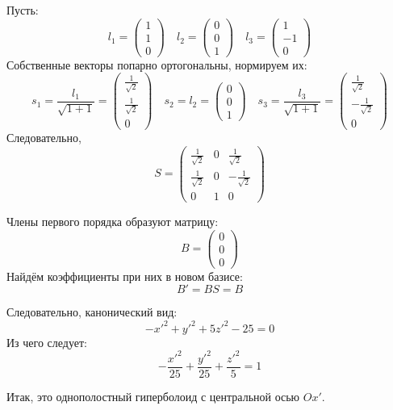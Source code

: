 Пусть:
\[
  l_1 =
  \begin{pmatrix}
    1 \\
    1 \\
    0
  \end{pmatrix} \quad
  l_2 =
  \begin{pmatrix}
    0 \\
    0 \\
    1
  \end{pmatrix} \quad
  l_3 =
  \begin{pmatrix}
    1 \\
    -1 \\
    0
  \end{pmatrix}
\]
Собственные векторы попарно ортогональны,
нормируем их:
\[
  s_1 = \frac{l_1}{\sqrt{1 + 1}} =
  \begin{pmatrix}
    \frac{1}{\sqrt{2}} \\
    \frac{1}{\sqrt{2}} \\
    0
  \end{pmatrix} \quad
  s_2 = l_2 =
  \begin{pmatrix}
    0 \\
    0 \\
    1
  \end{pmatrix} \quad
  s_3 = \frac{l_3}{\sqrt{1 + 1}} =
  \begin{pmatrix}
    \frac{1}{\sqrt{2}} \\
    -\frac{1}{\sqrt{2}} \\
    0
  \end{pmatrix}
\]
Следовательно,
\[
  S =
  \begin{pmatrix}
    \frac{1}{\sqrt{2}} & 0 & \frac{1}{\sqrt{2}} \\
    \frac{1}{\sqrt{2}} & 0 & -\frac{1}{\sqrt{2}} \\
    0 & 1 & 0
  \end{pmatrix}
\]

Члены первого порядка образуют матрицу:
\[
  B =
  \begin{pmatrix}
    0 \\ 0 \\ 0
  \end{pmatrix}
\]
Найдём коэффициенты при них в новом базисе:
\[
  B' = B S = B
\]

Следовательно, канонический вид:
\[-{x'}^2 + {y'}^2 + 5 {z'}^2 - 25 = 0\]
Из чего следует:
\[-\frac{{x'}^2}{25} + \frac{{y'}^2}{25} + \frac{{z'}^2}{5} = 1\]

Итак, это однополостный гиперболоид с центральной осью \(Ox'\).

